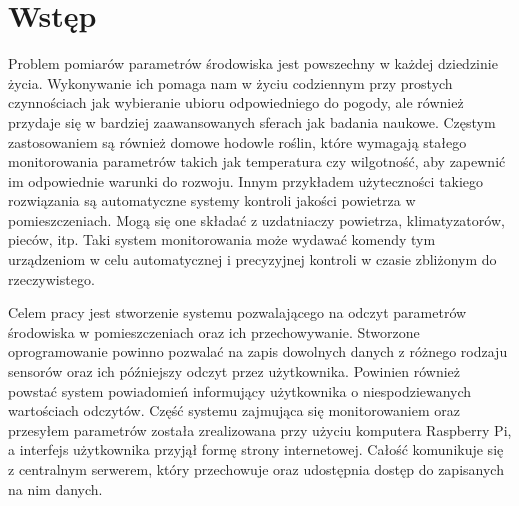 \chapter{Wstęp}

Problem pomiarów parametrów środowiska jest powszechny w każdej dziedzinie życia.
Wykonywanie ich pomaga nam w życiu codziennym przy prostych czynnościach jak
wybieranie ubioru odpowiedniego do pogody, ale również przydaje się w bardziej
zaawansowanych sferach jak badania naukowe. Częstym zastosowaniem są również
domowe hodowle roślin, które wymagają stałego monitorowania parametrów
takich jak temperatura czy wilgotność, aby zapewnić im odpowiednie warunki
do rozwoju. Innym przykładem użyteczności takiego rozwiązania są automatyczne
systemy kontroli jakości powietrza w pomieszczeniach. Mogą się one składać
z uzdatniaczy powietrza, klimatyzatorów, pieców, itp. Taki system monitorowania
może wydawać komendy tym urządzeniom w celu automatycznej i precyzyjnej kontroli
w czasie zbliżonym do rzeczywistego.

Celem pracy jest stworzenie systemu pozwalającego na odczyt parametrów środowiska
w pomieszczeniach oraz ich przechowywanie. Stworzone oprogramowanie powinno pozwalać
na zapis dowolnych danych z różnego rodzaju sensorów oraz ich późniejszy odczyt
przez użytkownika. Powinien również powstać system powiadomień informujący
użytkownika o niespodziewanych wartościach odczytów.
Część systemu zajmująca się monitorowaniem oraz przesyłem
parametrów została zrealizowana przy użyciu komputera Raspberry Pi, a
interfejs użytkownika przyjął formę strony internetowej. Całość komunikuje się
z centralnym serwerem, który przechowuje oraz udostępnia dostęp do
zapisanych na nim danych.

